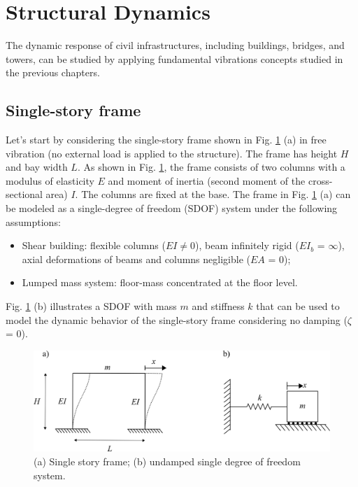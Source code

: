 \documentclass[12pt,letter]{article}
\begin{document}
	
	\setcounter{section}{7}	
	\setcounter{figure}{0}   
	\renewcommand\thefigure{\thesection.\arabic{figure}}
	\setcounter{equation}{0}   
	\renewcommand\theequation{\thesection.\arabic{equation}}	
	
	\section{Structural Dynamics}	

The dynamic response of civil infrastructures, including buildings, bridges, and towers, can be studied by applying fundamental vibrations concepts studied in the previous chapters. 
	
	\subsection{Single-story frame}

Let's start by considering the single-story frame shown in Fig. \ref{fig:one_story_frame_example} (a) in free vibration (no external load is applied to the structure). The frame has height $H$ and bay width $L$. As shown in Fig. \ref{fig:one_story_frame_example}, the frame consists of two columns with a modulus of elasticity $E$ and moment of inertia (second moment of the cross-sectional area) $I$. The columns are fixed at the base. The frame in Fig. \ref{fig:one_story_frame_example} (a) can be modeled as a single-degree of freedom (SDOF) system under the following assumptions:

\begin{itemize}
	\item Shear building: flexible columns ($EI \neq 0$), beam infinitely rigid ($EI_b$ = $\infty$), axial deformations of beams and columns negligible ($EA$ = 0);
	\item Lumped mass system: floor-mass concentrated at the floor level.
\end{itemize}

Fig. \ref{fig:one_story_frame_example} (b) illustrates a SDOF with mass $m$ and stiffness $k$ that can be used to model the dynamic behavior of the single-story frame considering no damping ($\zeta$ = 0). 

\begin{figure}[H]
	\centering
	\includegraphics{../figures/Single_story_frame.png}
	\caption{(a) Single story frame; (b) undamped single degree of freedom system.}
	\label{fig:one_story_frame_example}
\end{figure}
\end{document}
